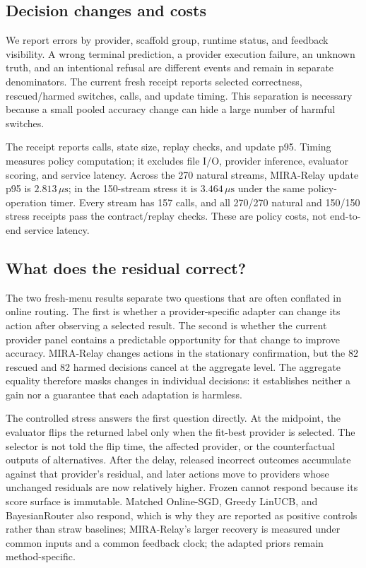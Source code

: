 \documentclass[sigconf,anonymous]{aamas}
\begin{document}
\subsection{Decision changes and costs}
We report errors by provider, scaffold group, runtime status, and feedback visibility. A wrong terminal prediction, a provider execution failure, an unknown truth, and an intentional refusal are different events and remain in separate denominators. The current fresh receipt reports selected correctness, rescued/harmed switches, calls, and update timing. This separation is necessary because a small pooled accuracy change can hide a large number of harmful switches.

The receipt reports calls, state size, replay checks, and update p95. Timing measures policy computation; it excludes file I/O, provider inference, evaluator scoring, and service latency. Across the 270 natural streams, MIRA-Relay update p95 is $2.813\,\mu\mathrm{s}$; in the 150-stream stress it is $3.464\,\mu\mathrm{s}$ under the same policy-operation timer. Every stream has 157 calls, and all 270/270 natural and 150/150 stress receipts pass the contract/replay checks. These are policy costs, not end-to-end service latency.

\subsection{What does the residual correct?}
The two fresh-menu results separate two questions that are often conflated in online routing. The first is whether a provider-specific adapter can change its action after observing a selected result. The second is whether the current provider panel contains a predictable opportunity for that change to improve accuracy. MIRA-Relay changes actions in the stationary confirmation, but the 82 rescued and 82 harmed decisions cancel at the aggregate level. The aggregate equality therefore masks changes in individual decisions: it establishes neither a gain nor a guarantee that each adaptation is harmless.

The controlled stress answers the first question directly. At the midpoint, the evaluator flips the returned label only when the fit-best provider is selected. The selector is not told the flip time, the affected provider, or the counterfactual outputs of alternatives. After the delay, released incorrect outcomes accumulate against that provider's residual, and later actions move to providers whose unchanged residuals are now relatively higher. Frozen cannot respond because its score surface is immutable. Matched Online-SGD, Greedy LinUCB, and BayesianRouter also respond, which is why they are reported as positive controls rather than straw baselines; MIRA-Relay's larger recovery is measured under common inputs and a common feedback clock; the adapted priors remain method-specific.
\end{document}
